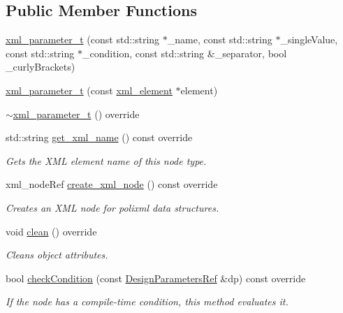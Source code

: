 \subsection*{Public Member Functions}
\begin{DoxyCompactItemize}
\item 
\hyperlink{classxml__parameter__t_a7caffd6264abca12e89ee53de27202e7}{xml\+\_\+parameter\+\_\+t} (const std\+::string $\ast$\+\_\+name, const std\+::string $\ast$\+\_\+single\+Value, const std\+::string $\ast$\+\_\+condition, const std\+::string \&\+\_\+separator, bool \+\_\+curly\+Brackets)
\item 
\hyperlink{classxml__parameter__t_a7ba134d6d789710c6cccb959c955341f}{xml\+\_\+parameter\+\_\+t} (const \hyperlink{classxml__element}{xml\+\_\+element} $\ast$element)
\item 
\hyperlink{classxml__parameter__t_af7b5e493a443865d557b36082b5ab4a7}{$\sim$xml\+\_\+parameter\+\_\+t} () override
\item 
std\+::string \hyperlink{classxml__parameter__t_a22e2fc519a78dbadd7dd583a5e6a5556}{get\+\_\+xml\+\_\+name} () const override
\begin{DoxyCompactList}\small\item\em Gets the X\+ML element name of this node type. \end{DoxyCompactList}\item 
xml\+\_\+node\+Ref \hyperlink{classxml__parameter__t_aa08b7e9ca07a2cc859a40a280b31f133}{create\+\_\+xml\+\_\+node} () const override
\begin{DoxyCompactList}\small\item\em Creates an X\+ML node for polixml data structures. \end{DoxyCompactList}\item 
void \hyperlink{classxml__parameter__t_a9fc1880ab4a4e6e4caa97f9f858c4c2e}{clean} () override
\begin{DoxyCompactList}\small\item\em Cleans object attributes. \end{DoxyCompactList}\item 
bool \hyperlink{classxml__parameter__t_a3ba5d8470dadb8afd334dfbaba43c05f}{check\+Condition} (const \hyperlink{DesignParameters_8hpp_ae36bb1c4c9150d0eeecfe1f96f42d157}{Design\+Parameters\+Ref} \&dp) const override
\begin{DoxyCompactList}\small\item\em If the node has a compile-\/time condition, this method evaluates it. \end{DoxyCompactList}\end{DoxyCompactItemize}
